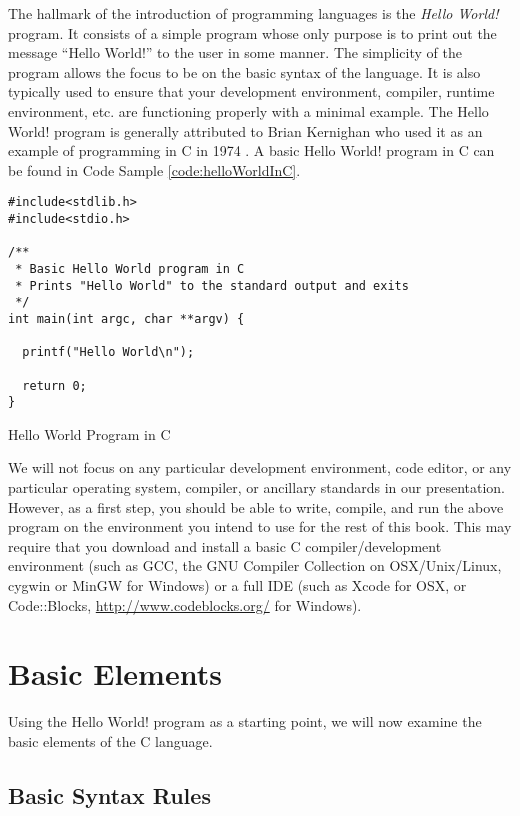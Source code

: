 The hallmark of the introduction of programming languages is the \emph{Hello World!}
program.  It consists of a simple program whose only purpose is to print out the message
``Hello World!'' to the user in some manner.  The simplicity of the program allows the
focus to be on the basic syntax of the language.  It is also typically used to ensure that 
your development environment, compiler, runtime environment, etc. are functioning 
properly with a minimal example.  The Hello World! program is generally attributed to 
Brian Kernighan who used it as an example of programming in C in 1974 \cite{Kernighan:1974}.
A basic Hello World! program in C can be found in Code Sample \ref{code:helloWorldInC}.

\begin{listing}
\begin{verbatim}
#include<stdlib.h>
#include<stdio.h>

/**
 * Basic Hello World program in C
 * Prints "Hello World" to the standard output and exits
 */
int main(int argc, char **argv) {

  printf("Hello World\n");

  return 0;
}
\end{verbatim}
\caption{Hello World Program in C}
\label{code:helloWorldInC}
\end{listing}

We will not focus on any particular development environment, code editor, or any 
particular operating system, compiler, or ancillary standards in our presentation.  However,
as a first step, you should be able to write, compile, and run the above program on the
environment you intend to use for the rest of this book.  This may require that you download
and install a basic C compiler/development environment (such as GCC, the GNU Compiler 
Collection on OSX/Unix/Linux, cygwin or MinGW for Windows) or a full IDE (such as Xcode 
for OSX, or Code::Blocks, \url{http://www.codeblocks.org/} for Windows).

\section{Basic Elements}

Using the Hello World! program as a starting point, we will now examine the basic
elements of the C language.

\subsection{Basic Syntax Rules}

